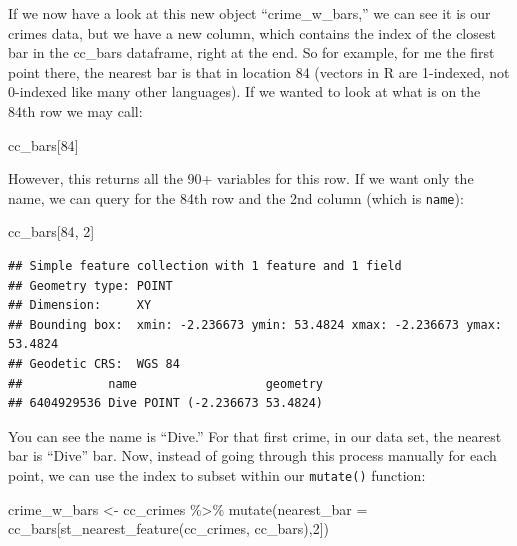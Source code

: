 \documentclass[
]{book}
\makeatletter
\newenvironment{Shaded}{\begin{snugshade}}{\end{snugshade}}
\newcommand{\AttributeTok}[1]{\textcolor[rgb]{0.61,0.61,0.61}{#1}}
\newcommand{\DecValTok}[1]{\textcolor[rgb]{0.06,0.06,0.06}{#1}}
\newcommand{\FunctionTok}[1]{\textcolor[rgb]{0,0,0}{#1}}
\newcommand{\NormalTok}[1]{#1}
\newcommand{\OtherTok}[1]{\textcolor[rgb]{0.37,0.37,0.37}{#1}}
\newcommand{\SpecialCharTok}[1]{\textcolor[rgb]{0,0,0}{#1}}
\newenvironment{kframe}{%
\medskip{}
\setlength{\fboxsep}{.8em}
 \def\at@end@of@kframe{}%
 \ifinner\ifhmode%
  \def\at@end@of@kframe{\end{minipage}}%
  \begin{minipage}{\columnwidth}%
 \fi\fi%
 \def\FrameCommand##1{\hskip\@totalleftmargin \hskip-\fboxsep
 \colorbox{shadecolor}{##1}\hskip-\fboxsep
     \hskip-\linewidth \hskip-\@totalleftmargin \hskip\columnwidth}%
 \MakeFramed {\advance\hsize-\width
   \@totalleftmargin\z@ \linewidth\hsize
   \@setminipage}}%
 {\par\unskip\endMakeFramed%
 \at@end@of@kframe}
\renewenvironment{Shaded}{\begin{kframe}}{\end{kframe}}
\makeatother
\begin{document}
If we now have a look at this new object ``crime\_w\_bars,'' we can see it is our crimes data, but we have a new column, which contains the index of the closest bar in the cc\_bars dataframe, right at the end. So for example, for me the first point there, the nearest bar is that in location 84 (vectors in R are 1-indexed, not 0-indexed like many other languages). If we wanted to look at what is on the 84th row we may call:

\begin{Shaded}
\begin{Highlighting}[]
\NormalTok{cc\_bars[}\DecValTok{84}\NormalTok{]}
\end{Highlighting}
\end{Shaded}

However, this returns all the 90+ variables for this row. If we want only the name, we can query for the 84th row and the 2nd column (which is \texttt{name}):

\begin{Shaded}
\begin{Highlighting}[]
\NormalTok{cc\_bars[}\DecValTok{84}\NormalTok{, }\DecValTok{2}\NormalTok{]}
\end{Highlighting}
\end{Shaded}

\begin{verbatim}
## Simple feature collection with 1 feature and 1 field
## Geometry type: POINT
## Dimension:     XY
## Bounding box:  xmin: -2.236673 ymin: 53.4824 xmax: -2.236673 ymax: 53.4824
## Geodetic CRS:  WGS 84
##            name                  geometry
## 6404929536 Dive POINT (-2.236673 53.4824)
\end{verbatim}

You can see the name is ``Dive.'' For that first crime, in our data set, the nearest bar is ``Dive'' bar. Now, instead of going through this process manually for each point, we can use the index to subset within our \texttt{mutate()} function:

\begin{Shaded}
\begin{Highlighting}[]
\NormalTok{crime\_w\_bars  }\OtherTok{\textless{}{-}}\NormalTok{ cc\_crimes }\SpecialCharTok{\%\textgreater{}\%} 
  \FunctionTok{mutate}\NormalTok{(}\AttributeTok{nearest\_bar =}\NormalTok{ cc\_bars[}\FunctionTok{st\_nearest\_feature}\NormalTok{(cc\_crimes, cc\_bars),}\DecValTok{2}\NormalTok{])}
\end{Highlighting}
\end{Shaded}
\end{document}
